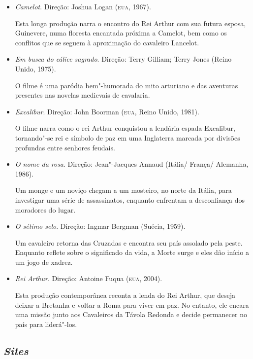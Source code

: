 \documentclass[11pt]{extarticle}
\begin{document}
\begin{itemize}

\item\textit{Camelot}. Direção: Joshua Logan (\textsc{eua}, 1967).

Esta longa produção narra o encontro do Rei Arthur com sua futura
esposa, Guinevere, numa floresta encantada próxima a Camelot, bem como
os conflitos que se seguem à aproximação do cavaleiro Lancelot.

\item\textit{Em busca do cálice sagrado}. Direção: Terry Gilliam; ‎Terry
Jones (Reino Unido, 1975).

O filme é uma paródia bem"-humorada do mito arturiano e das aventuras
presentes nas novelas medievais de cavalaria.

\item\textit{Excalibur}. Direção: John Boorman (\textsc{eua}, Reino Unido, 1981).

O filme narra como o rei Arthur conquistou a lendária espada
Excalibur, tornando"-se rei e símbolo de paz em uma Inglaterra marcada
por divisões profundas entre senhores feudais.

\item\textit{O nome da rosa}. Direção: Jean"-Jacques Annaud (Itália/ França/
Alemanha, 1986).

Um monge e um noviço chegam a um mosteiro, no norte da Itália, para
investigar uma série de assassinatos, enquanto enfrentam a 
desconfiança dos moradores do lugar.

\item\textit{O sétimo selo}. Direção: Ingmar Bergman (Suécia, 1959).

Um cavaleiro retorna das Cruzadas e encontra seu país assolado pela
peste. Enquanto reflete sobre o significado da vida, a Morte surge e
eles dão início a um jogo de xadrez.

\item\textit{Rei Arthur}. Direção: Antoine Fuqua (\textsc{eua}, 2004).

Esta produção contemporânea reconta a lenda do Rei Arthur, que deseja
deixar a Bretanha e voltar a Roma para viver em paz. No entanto, ele
encara uma missão junto aos Cavaleiros da Távola Redonda e decide
permanecer no país para liderá"-los.
\end{itemize}

\subsection{\emph{Sites}}
\end{document}
